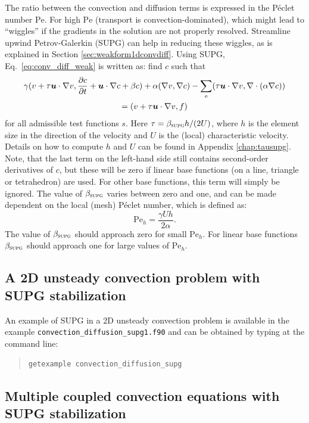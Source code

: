 The ratio between the convection and diffusion terms is expressed in the 
P\'{e}clet number $\mathrm{Pe}$. For high $\mathrm{Pe}$ (transport is convection-dominated), 
which 
might lead to ``wiggles'' if the gradients in the solution are not properly 
resolved. Streamline upwind Petrov-Galerkin (SUPG) can help in reducing these wiggles, 
as is explained in Section \ref{sec:weakform1dconvdiff}. Using SUPG, 
Eq.~\eqref{eq:conv_diff_weak} is written as: find $c$ such that
\begin{multline}
  \gamma (v+\tau \boldsymbol{u} \cdot \nabla v, \dfrac{\partial c}{\partial t} + \boldsymbol{u} \cdot 
  \nabla c + \beta c)  + \alpha 
  (\nabla v, \nabla c) - \sum_\text{e} (\tau \boldsymbol{u} \cdot \nabla v,\nabla 
  \cdot (\alpha \nabla c)) \\
  = (v+\tau \boldsymbol{u} \cdot \nabla v, f ) 
  \label{eq:conv_diff_supg}
\end{multline}
for all admissible test functions $s$. Here $\tau = \beta_\textsc{supg} h / (2U)$, where $h$ 
is the element size in the direction 
of the velocity and $U$ is the (local) characteristic velocity. Details on how to 
compute $h$ and $U$ can be found in Appendix \ref{chap:tausupg}. Note, that the 
last term on the left-hand side still contains second-order derivatives of $c$, 
but these will be zero if linear base functions (on a line, triangle or tetrahedron) are used. 
For other base functions, this term will simply be ignored. The value of $\beta_\textsc{supg}$ 
varies between zero and one, and can be made dependent on the local (mesh) 
P\'{e}clet number, which is defined as:
\begin{equation}
  \mathrm{Pe}_h = \frac{\gamma U h}{2\alpha}.\label{eq:Peh}
\end{equation}
The value of $\beta_\textsc{supg}$ should approach zero for small 
$\mathrm{Pe}_h$. For linear base functions $\beta_\textsc{supg}$ should approach one for large values of 
$\mathrm{Pe}_h$. 

\subsection{A 2D unsteady convection problem with SUPG stabilization}
An example
of SUPG in a 2D unsteady convection problem is available in the example
\texttt{convection\_diffusion\_supg1.f90} and can be obtained  
by typing at the command line:
\begin{quote}
   \texttt{getexample convection\_diffusion\_supg}
\end{quote}

\subsection{Multiple coupled convection equations with SUPG stabilization}


